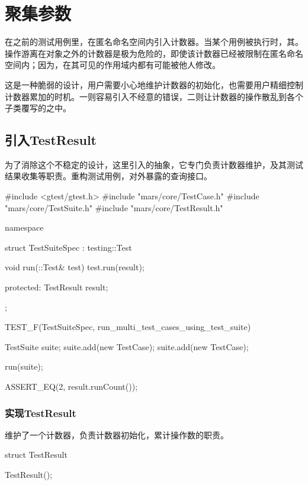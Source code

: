 \section{聚集参数}

\begin{content}

在之前的测试用例里，在匿名命名空间内引入计数器。当某个用例被执行时，其。操作游离在对象之外的计数器是极为危险的，即使该计数器已经被限制在匿名命名空间内；因为，在其可见的作用域内都有可能被他人修改。

这是一种脆弱的设计，用户需要小心地维护计数器的初始化，也需要用户精细控制计数器累加的时机。一则容易引入不经意的错误，二则让计数器的操作散乱到各个子类覆写的之中。

\subsection{引入TestResult}

为了消除这个不稳定的设计，这里引入的抽象，它专门负责计数器维护，及其测试结果收集等职责。重构测试用例，对外暴露的查询接口。

\begin{leftbar}
 \begin{c++}[caption={\ttfamily{test/mars/core/TestSuiteSpec.cc}}]
#include <gtest/gtest.h>
#include "mars/core/TestCase.h"
#include "mars/core/TestSuite.h"
#include "mars/core/TestResult.h"

namespace {
  struct TestSuiteSpec : testing::Test {
    void run(::Test& test) {
      test.run(result);
    }

  protected:
    TestResult result;
  };
}

TEST_F(TestSuiteSpec, run_multi_test_cases_using_test_suite) {
  TestSuite suite;
  suite.add(new TestCase);
  suite.add(new TestCase);

  run(suite);

  ASSERT_EQ(2, result.runCount());
}
 \end{c++}
\end{leftbar}

\subsubsection{实现TestResult}

维护了一个计数器，负责计数器初始化，累计操作数的职责。

\begin{leftbar}
 \begin{c++}[caption={\ttfamily{include/mars/core/TestResult.h}}]
struct TestResult {
  TestResult();

}
\end{c++}
\end{leftbar}
\end{content}
